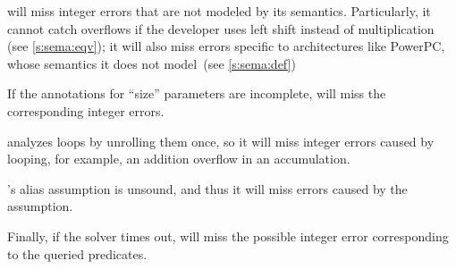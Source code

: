 \sys will miss integer errors
that are not modeled by its semantics.  Particularly, it cannot catch
overflows if the developer uses left shift instead of multiplication
(see \autoref{s:sema:eqv});
it will also miss errors specific to architectures like PowerPC,
whose semantics it does not model~(see \autoref{s:sema:def})

If the annotations for ``size'' parameters are incomplete, \sys will
miss the corresponding integer errors.

\sys analyzes loops by unrolling them once, so it will miss integer
errors caused by looping, for example, an addition overflow in an
accumulation.

\sys's alias assumption is unsound, and thus it will miss errors
caused by the assumption.

Finally, if the solver times out, \sys will miss the possible integer
error corresponding to the queried predicates.
